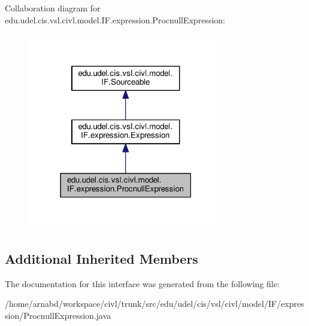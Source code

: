 Collaboration diagram for edu.\+udel.\+cis.\+vsl.\+civl.\+model.\+I\+F.\+expression.\+Procnull\+Expression\+:
\nopagebreak
\begin{figure}[H]
\begin{center}
\leavevmode
\includegraphics[width=243pt]{interfaceedu_1_1udel_1_1cis_1_1vsl_1_1civl_1_1model_1_1IF_1_1expression_1_1ProcnullExpression__coll__graph}
\end{center}
\end{figure}
\subsection*{Additional Inherited Members}


The documentation for this interface was generated from the following file\+:\begin{DoxyCompactItemize}
\item 
/home/arnabd/workspace/civl/trunk/src/edu/udel/cis/vsl/civl/model/\+I\+F/expression/Procnull\+Expression.\+java\end{DoxyCompactItemize}

